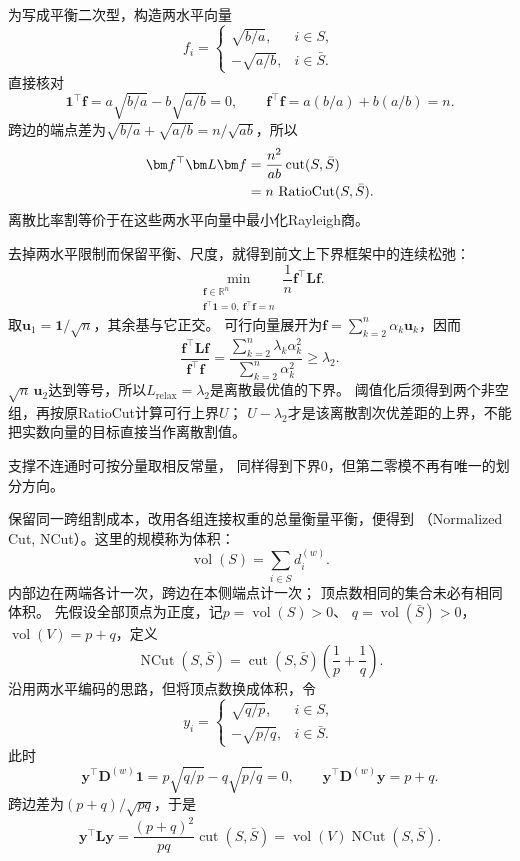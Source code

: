 为写成平衡二次型，构造两水平向量
\begin{equation}
  f_i=
  \begin{cases}
    \sqrt{b/a},&i\in S,\\
    -\sqrt{a/b},&i\in\bar S.
  \end{cases}
  \label{eq:graph-theory-ratio-cut-balanced-vector}
\end{equation}
直接核对
\[
  \bm1^\top\bm f=a\sqrt{b/a}-b\sqrt{a/b}=0,\qquad
  \bm f^\top\bm f=a(b/a)+b(a/b)=n.
\]
跨边的端点差为\(\sqrt{b/a}+\sqrt{a/b}=n/\sqrt{ab}\)，所以
\begin{align}
  \bm f^\top\bm L\bm f
  &=\frac{n^2}{ab}\operatorname{cut}(S,\bar S)\notag\\
  &=n\,\operatorname{RatioCut}(S,\bar S).
  \label{eq:graph-theory-ratio-cut-energy}
\end{align}
离散比率割等价于在这些两水平向量中最小化Rayleigh商。

去掉两水平限制而保留平衡、尺度，就得到前文上下界框架中的连续松弛：
\begin{equation}
  \min_{\substack{\bm f\in\mathbb R^n\\
      \bm f^\top\bm1=0,\ \bm f^\top\bm f=n}}
      \frac1n\bm f^\top\bm L\bm f.
  \label{eq:graph-theory-ratio-cut-relaxation}
\end{equation}
取\(\bm u_1=\bm1/\sqrt n\)，其余基与它正交。
可行向量展开为\(\bm f=\sum_{k=2}^n\alpha_k\bm u_k\)，因而
\[
  \frac{\bm f^\top\bm L\bm f}{\bm f^\top\bm f}
  =\frac{\sum_{k=2}^n\lambda_k\alpha_k^2}{\sum_{k=2}^n\alpha_k^2}
  \geq\lambda_2.
\]
\(\sqrt n\,\bm u_2\)达到等号，所以\(L_{\mathrm{relax}}=\lambda_2\)是离散最优值的下界。
阈值化后须得到两个非空组，再按原RatioCut计算可行上界\(U\)；
\(U-\lambda_2\)才是该离散割次优差距的上界，不能把实数向量的目标直接当作离散割值。

支撑不连通时可按分量取相反常量，
同样得到下界\(0\)，但第二零模不再有唯一的划分方向。

保留同一跨组割成本，改用各组连接权重的总量衡量平衡，便得到
（Normalized Cut, NCut）。这里的规模称为体积：
\[
  \operatorname{vol}(S)=\sum_{i\in S}d_i^{(w)}.
\]
内部边在两端各计一次，跨边在本侧端点计一次；
顶点数相同的集合未必有相同体积。
先假设全部顶点为正度，记\(p=\operatorname{vol}(S)>0\)、
\(q=\operatorname{vol}(\bar S)>0\)，\(\operatorname{vol}(V)=p+q\)，定义
\begin{equation}
  \operatorname{NCut}(S,\bar S)
  =\operatorname{cut}(S,\bar S)\left(\frac1p+\frac1q\right).
  \label{eq:graph-theory-normalized-cut}
\end{equation}
沿用两水平编码的思路，但将顶点数换成体积，令
\[
  y_i=
  \begin{cases}
    \sqrt{q/p},&i\in S,\\
    -\sqrt{p/q},&i\in\bar S.
  \end{cases}
\]
此时
\[
  \bm y^\top\bm D^{(w)}\bm1=p\sqrt{q/p}-q\sqrt{p/q}=0,
  \qquad
  \bm y^\top\bm D^{(w)}\bm y=p+q.
\]
跨边差为\((p+q)/\sqrt{pq}\)，于是
\[
  \bm y^\top\bm L\bm y
  =\frac{(p+q)^2}{pq}\operatorname{cut}(S,\bar S)
  =\operatorname{vol}(V)\operatorname{NCut}(S,\bar S).
\]


